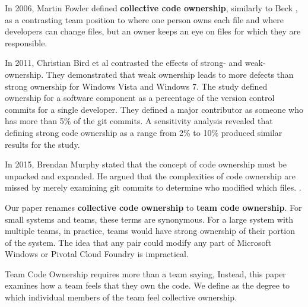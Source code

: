 In 2006, Martin Fowler defined \textbf{collective code ownership}, similarly to Beck \cite{FowlerCodeOwnership}, as a contrasting team position to  where one person owns each file and  where developers can change files, but an owner keeps an eye on files for which they are responsible. 

In 2011, Christian Bird et al \cite{BirdDontTouchMyCode} contrasted the effects of strong- and weak-ownership. They demonstrated that weak ownership leads to more defects than strong ownership for Windows Vista and Windows 7. The study defined ownership for a software component as a percentage of the version control commits for a single developer. They defined a major contributor as someone who has more than 5\% of the git commits. A sensitivity analysis revealed that defining strong code ownership as a range from 2\% to 10\% produced similar results for the study.

In 2015, Brendan Murphy stated that the concept of code ownership must be unpacked and expanded. He argued that the complexities of code ownership are missed by merely examining git commits to determine who modified which files. \cite{MurphyIEEESoftware}.

Our paper renames \textbf{collective code ownership} to \textbf{team code ownership}. For small systems and teams, these terms are synonymous. For a large system with multiple teams, in practice, teams would have strong ownership of their portion of the system. The idea that any pair could modify any part of Microsoft Windows or Pivotal Cloud Foundry is impractical.

Team Code Ownership requires more than a team saying,  Instead, this paper examines how a team feels that they own the code. We define  as the degree to which individual members of the team feel collective ownership.  


